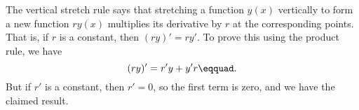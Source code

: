 The vertical stretch rule says that
stretching a function $y(x)$ vertically to form a new function $ry(x)$ multiplies its
                   derivative by $r$ at the corresponding points.
That is, if $r$ is a constant, then $(ry)'=ry'$. To prove this using the product
rule, we have
\begin{equation*}
  (ry)' = r'y+y'r\eqquad.
\end{equation*}
But if $r'$ is a constant, then $r'=0$, so the first term is zero, and we have the
claimed result.
